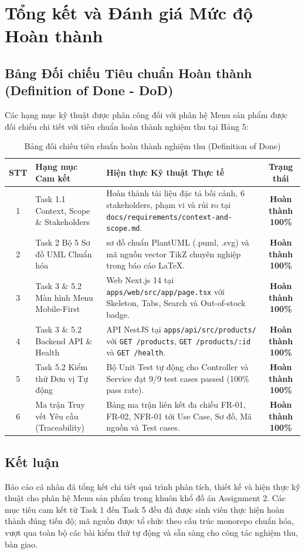\documentclass[a4paper]{article}
\begin{document}
\section{Tổng kết và Đánh giá Mức độ Hoàn thành}

\subsection{Bảng Đối chiếu Tiêu chuẩn Hoàn thành (Definition of Done - DoD)}
Các hạng mục kỹ thuật được phân công đối với phân hệ Menu sản phẩm được đối chiếu chi tiết với tiêu chuẩn hoàn thành nghiệm thu tại Bảng 5:

\begin{table}[H]
\centering
\small
\begin{tabularx}{\textwidth}{|c|>{\raggedright\arraybackslash}p{4.5cm}|>{\raggedright\arraybackslash}X|c|}
\hline
\textbf{STT} & \textbf{Hạng mục Cam kết} & \textbf{Hiện thực Kỹ thuật Thực tế} & \textbf{Trạng thái} \\ \hline
1 & Task 1.1 Context, Scope \& Stakeholders & Hoàn thành tài liệu đặc tả bối cảnh, 6 stakeholders, phạm vi và rủi ro tại \nolinkurl{docs/requirements/context-and-scope.md}. & \textbf{Hoàn thành 100\%} \\ \hline
2 & Task 2 Bộ 5 Sơ đồ UML Chuẩn hóa & 5 sơ đồ chuẩn PlantUML (.puml, .svg) và mã nguồn vector TikZ chuyên nghiệp trong báo cáo LaTeX. & \textbf{Hoàn thành 100\%} \\ \hline
3 & Task 3 \& 5.2 Màn hình Menu Mobile-First & Web Next.js 14 tại \nolinkurl{apps/web/src/app/page.tsx} với Skeleton, Tabs, Search và Out-of-stock badge. & \textbf{Hoàn thành 100\%} \\ \hline
4 & Task 3 \& 5.2 Backend API \& Health & API NestJS tại \nolinkurl{apps/api/src/products/} với \texttt{GET /products}, \texttt{GET /products/:id} và \texttt{GET /health}. & \textbf{Hoàn thành 100\%} \\ \hline
5 & Task 5.2 Kiểm thử Đơn vị Tự động & Bộ Unit Test tự động cho Controller và Service đạt 9/9 test cases passed (100\% pass rate). & \textbf{Hoàn thành 100\%} \\ \hline
6 & Ma trận Truy vết Yêu cầu (Traceability) & Bảng ma trận liên kết đa chiều FR-01, FR-02, NFR-01 tới Use Case, Sơ đồ, Mã nguồn và Test cases. & \textbf{Hoàn thành 100\%} \\ \hline
\end{tabularx}
\caption{Bảng đối chiếu tiêu chuẩn hoàn thành nghiệm thu (Definition of Done)}
\label{tab:dod_evaluation}
\end{table}

\subsection{Kết luận}
Báo cáo cá nhân đã tổng kết chi tiết quá trình phân tích, thiết kế và hiện thực kỹ thuật cho phân hệ Menu sản phẩm trong khuôn khổ đồ án Assignment 2. Các mục tiêu cam kết từ Task 1 đến Task 5 đều đã được sinh viên thực hiện hoàn thành đúng tiến độ; mã nguồn được tổ chức theo cấu trúc monorepo chuẩn hóa, vượt qua toàn bộ các bài kiểm thử tự động và sẵn sàng cho công tác nghiệm thu, bàn giao.
\end{document}
